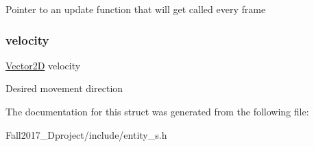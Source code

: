 Pointer to an update function that will get called every frame \mbox{\label{structentity__s_a5b7790a4c9666f321ce2228f1b8bd118}} 
\subsubsection{\texorpdfstring{velocity}{velocity}}
{\footnotesize\ttfamily \hyperlink{struct_vector2_d}{Vector2D} velocity}

Desired movement direction 

The documentation for this struct was generated from the following file\+:\begin{DoxyCompactItemize}
\item 
Fall2017\+\_\+Dproject/include/entity\+\_\+s.\+h\end{DoxyCompactItemize}

